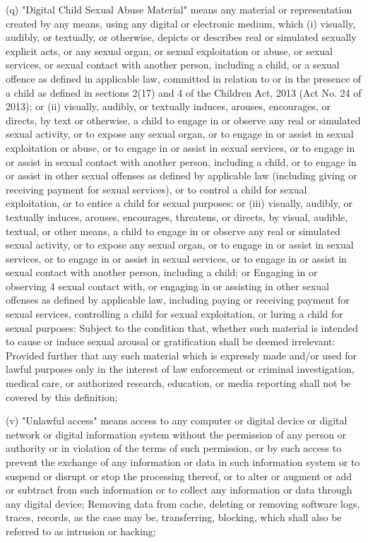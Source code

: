 (q) "Digital Child Sexual Abuse Material" means any material or representation created by
any means, using any digital or electronic medium, which
(i) visually, audibly, or textually, or otherwise, depicts or describes real or simulated
sexually explicit acts, or any sexual organ, or sexual exploitation or abuse, or sexual
services, or sexual contact with another person, including a child, or a sexual offence
as defined in applicable law, committed in relation to or in the presence of a child as
defined in sections 2(17) and 4 of the Children Act, 2013 (Act No. 24 of 2013); or
(ii) visually, audibly, or textually induces, arouses, encourages, or directs, by text or
otherwise, a child to engage in or observe any real or simulated sexual activity, or to
expose any sexual organ, or to engage in or assist in sexual exploitation or abuse, or
to engage in or assist in sexual services, or to engage in or assist in sexual contact with
another person, including a child, or to engage in or assist in other sexual offenses as
defined by applicable law (including giving or receiving payment for sexual services),
or to control a child for sexual exploitation, or to entice a child for sexual purposes;
or
(iii) visually, audibly, or textually induces, arouses, encourages, threatens, or directs, by
visual, audible, textual, or other means, a child to engage in or observe any real or
simulated sexual activity, or to expose any sexual organ, or to engage in or assist in
sexual services, or to engage in or assist in sexual services, or to engage in or assist in
sexual contact with another person, including a child; or Engaging in or observing
4
sexual contact with, or engaging in or assisting in other sexual offenses as defined by
applicable law, including paying or receiving payment for sexual services, controlling
a child for sexual exploitation, or luring a child for sexual purposes:
Subject to the condition that, whether such material is intended to cause or induce sexual
arousal or gratification shall be deemed irrelevant:
Provided further that any such material which is expressly made and/or used for lawful
purposes only in the interest of law enforcement or criminal investigation, medical care, or
authorized research, education, or media reporting shall not be covered by this definition;




(v) "Unlawful access" means access to any computer or digital device or digital network or
digital information system without the permission of any person or authority or in violation of
the terms of such permission, or by such access to prevent the exchange of any information or
data in such information system or to suspend or disrupt or stop the processing thereof, or to
alter or augment or add or subtract from such information or to collect any information or data
through any digital device; Removing data from cache, deleting or removing software logs,
traces, records, as the case may be, transferring, blocking, which shall also be referred to as
intrusion or hacking; 



